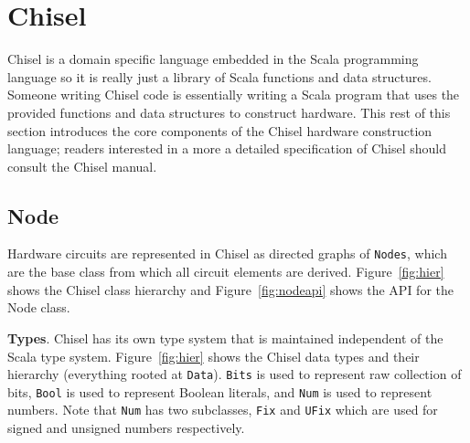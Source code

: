 \section{Chisel}
\label{sec:chisel}
Chisel is a domain specific language embedded in the Scala
programming language so it is really just a library of Scala functions
and data structures. Someone writing Chisel code is essentially writing a Scala
program that uses the provided functions and data structures to
construct hardware. This rest of this section introduces the core
components of the Chisel hardware construction language; readers
interested in a more a detailed specification of Chisel should consult
the Chisel manual. 

\subsection{Node}
Hardware circuits are represented in Chisel as directed graphs of
{\tt Nodes}, which are the base class from which all circuit elements are
derived. Figure~\ref{fig:hier} shows the Chisel class
hierarchy and Figure~\ref{fig:nodeapi} shows the API for the Node class.

{\bf Types}. Chisel has its own type system that is maintained
independent of the Scala type system. Figure~\ref{fig:hier} shows the
Chisel data types and their hierarchy (everything rooted at
{\tt Data}). {\tt Bits} is used to represent raw collection of bits,
{\tt Bool} is used to represent Boolean literals, and {\tt Num} is
used to represent numbers. Note that {\tt Num} has two subclasses,
{\tt Fix} and {\tt UFix} which are used for signed and unsigned
numbers respectively.

